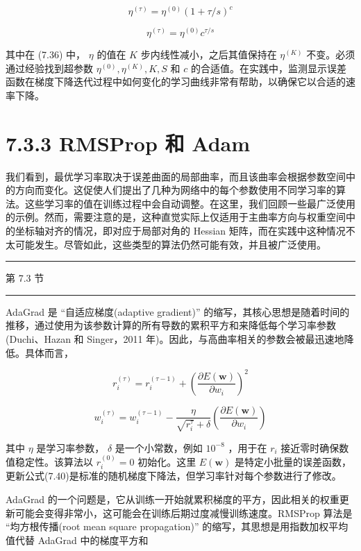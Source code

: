 \documentclass[10pt]{article}
\newcommand{\HRule}{\begin{center}\rule{0.9\linewidth}{0.2mm}\end{center}}
\begin{document}
\[
{\eta }^{\left( \tau \right) } = {\eta }^{\left( 0\right) }{\left( 1 + \tau /s\right) }^{c} \tag{7.37}
\]

\[
{\eta }^{\left( \tau \right) } = {\eta }^{\left( 0\right) }{c}^{\tau /s} \tag{7.38}
\]

其中在 (7.36) 中， \(\eta\) 的值在 \(K\) 步内线性减小，之后其值保持在 \({\eta }^{\left( K\right) }\) 不变。必须通过经验找到超参数 \({\eta }^{\left( 0\right) },{\eta }^{\left( K\right) },K,S\) 和 \(c\) 的合适值。在实践中，监测显示误差函数在梯度下降迭代过程中如何变化的学习曲线非常有帮助，以确保它以合适的速率下降。

\section*{7.3.3 RMSProp 和 Adam}

我们看到，最优学习率取决于误差曲面的局部曲率，而且该曲率会根据参数空间中的方向而变化。这促使人们提出了几种为网络中的每个参数使用不同学习率的算法。这些学习率的值在训练过程中会自动调整。在这里，我们回顾一些最广泛使用的示例。然而，需要注意的是，这种直觉实际上仅适用于主曲率方向与权重空间中的坐标轴对齐的情况，即对应于局部对角的 Hessian 矩阵，而在实践中这种情况不太可能发生。尽管如此，这些类型的算法仍然可能有效，并且被广泛使用。

\HRule

第 7.3 节

\HRule

AdaGrad 是 “自适应梯度(adaptive gradient)” 的缩写，其核心思想是随着时间的推移，通过使用为该参数计算的所有导数的累积平方和来降低每个学习率参数(Duchi、Hazan 和 Singer，2011 年)。因此，与高曲率相关的参数会被最迅速地降低。具体而言，

\[
{r}_{i}^{\left( \tau \right) } = {r}_{i}^{\left( \tau  - 1\right) } + {\left( \frac{\partial E\left( \mathbf{w}\right) }{\partial {w}_{i}}\right) }^{2} \tag{7.39}
\]

\[
{w}_{i}^{\left( \tau \right) } = {w}_{i}^{\left( \tau  - 1\right) } - \frac{\eta }{\sqrt{{r}_{i}^{\tau }} + \delta }\left( \frac{\partial E\left( \mathbf{w}\right) }{\partial {w}_{i}}\right)  \tag{7.40}
\]

其中 \(\eta\) 是学习率参数， \(\delta\) 是一个小常数，例如 \({10}^{-8}\) ，用于在 \({r}_{i}\) 接近零时确保数值稳定性。该算法以 \({r}_{i}^{\left( 0\right) } = 0\) 初始化。这里 \(E\left( \mathbf{w}\right)\) 是特定小批量的误差函数，更新公式(7.40)是标准的随机梯度下降法，但学习率针对每个参数进行了修改。

AdaGrad 的一个问题是，它从训练一开始就累积梯度的平方，因此相关的权重更新可能会变得非常小，这可能会在训练后期过度减慢训练速度。RMSProp 算法是 “均方根传播(root mean square propagation)” 的缩写，其思想是用指数加权平均值代替 AdaGrad 中的梯度平方和
\end{document}
